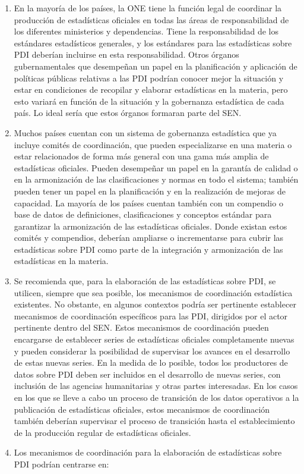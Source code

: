 \documentclass[
]{book}
\begin{document}
\begin{enumerate}
\item
  En la mayoría de los países, la ONE tiene la función legal de coordinar la producción de estadísticas oficiales en todas las áreas de responsabilidad de los diferentes ministerios y dependencias. Tiene la responsabilidad de los estándares estadísticos generales, y los estándares para las estadísticas sobre PDI deberían incluirse en esta responsabilidad. Otros órganos gubernamentales que desempeñan un papel en la planificación y aplicación de políticas públicas relativas a las PDI podrían conocer mejor la situación y estar en condiciones de recopilar y elaborar estadísticas en la materia, pero esto variará en función de la situación y la gobernanza estadística de cada país. Lo ideal sería que estos órganos formaran parte del SEN.
\item
  Muchos países cuentan con un sistema de gobernanza estadística que ya incluye comités de coordinación, que pueden especializarse en una materia o estar relacionados de forma más general con una gama más amplia de estadísticas oficiales. Pueden desempeñar un papel en la garantía de calidad o en la armonización de las clasificaciones y normas en todo el sistema; también pueden tener un papel en la planificación y en la realización de mejoras de capacidad. La mayoría de los países cuentan también con un compendio o base de datos de definiciones, clasificaciones y conceptos estándar para garantizar la armonización de las estadísticas oficiales. Donde existan estos comités y compendios, deberían ampliarse o incrementarse para cubrir las estadísticas sobre PDI como parte de la integración y armonización de las estadísticas en la materia.
\item
  Se recomienda que, para la elaboración de las estadísticas sobre PDI, se utilicen, siempre que sea posible, los mecanismos de coordinación estadística existentes. No obstante, en algunos contextos podría ser pertinente establecer mecanismos de coordinación específicos para las PDI, dirigidos por el actor pertinente dentro del SEN. Estos mecanismos de coordinación pueden encargarse de establecer series de estadísticas oficiales completamente nuevas y pueden considerar la posibilidad de supervisar los avances en el desarrollo de estas nuevas series. En la medida de lo posible, todos los productores de datos sobre PDI deben ser incluidos en el desarrollo de nuevas series, con inclusión de las agencias humanitarias y otras partes interesadas. En los casos en los que se lleve a cabo un proceso de transición de los datos operativos a la publicación de estadísticas oficiales, estos mecanismos de coordinación también deberían supervisar el proceso de transición hasta el establecimiento de la producción regular de estadísticas oficiales.
\item
  Los mecanismos de coordinación para la elaboración de estadísticas sobre PDI podrían centrarse en:


\end{enumerate}
\end{document}
